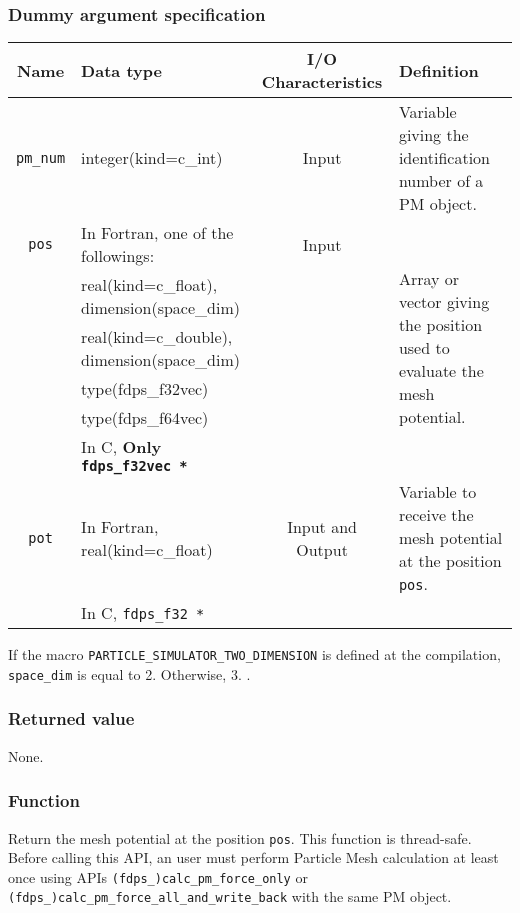 \subsubsection*{Dummy argument specification}
\begin{table}[h]
\begin{tabularx}{\linewidth}{cp{6cm}cX}
\toprule
\rowcolor{Snow2}
Name & Data type & I/O Characteristics & Definition \\
\midrule
\texttt{pm\_num} & integer(kind=c\_int) & Input & Variable giving the identification number of a PM object.\\
\texttt{pos} & In Fortran, one of the followings: & Input & \multirow[t]{6}{\hsize}{Array or vector giving the position used to evaluate the mesh potential.} \\
& real(kind=c\_float), \newline\hspace{1em} dimension(space\_dim) &&\\
& real(kind=c\_double),\newline\hspace{1em} dimension(space\_dim) &&\\
& type(fdps\_f32vec) & & \\
& type(fdps\_f64vec) & & \\
& In C, \textbf{Only \texttt{fdps\_f32vec *}} &&\\
\texttt{pot} & In Fortran, real(kind=c\_float) & Input and Output & Variable to receive the mesh potential at the position \texttt{pos}.\\
& In C, \texttt{fdps\_f32 *} &&\\
\bottomrule
\end{tabularx}
\end{table}
If the macro \texttt{PARTICLE\_SIMULATOR\_TWO\_DIMENSION} is defined at the compilation, \texttt{space\_dim} is equal to 2. Otherwise, 3. {\setnoko{}}.

\subsubsection*{Returned value}
None.

\subsubsection*{Function}
Return the mesh potential at the position \texttt{pos}. This function is thread-safe. Before calling this API, an user must perform Particle Mesh calculation at least once using APIs \texttt{(fdps\_)calc\_pm\_force\_only} or \texttt{(fdps\_)calc\_pm\_force\_all\_and\_write\_back} with the same PM object.

